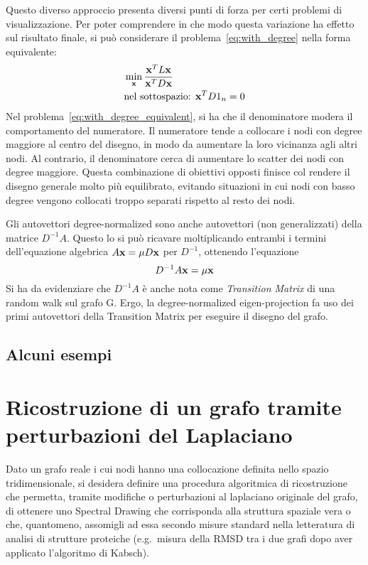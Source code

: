 \documentclass[10pt,a4paper]{article}
\begin{document}
Questo diverso approccio presenta diversi punti di forza per certi problemi di visualizzazione.
Per poter comprendere in che modo questa variazione ha effetto sul risultato finale, si può considerare il problema~\eqref{eq:with_degree} nella forma equivalente:
\begin{align}
    & \min_{\vb{x}} \frac{\vb{x}^T L \vb{x}}{\vb{x}^T D \vb{x}} \label{eq:with_degree_equivalent}\\
    & \text{nel sottospazio: } \vb{x}^T D 1_n = 0
\end{align}
Nel problema~\eqref{eq:with_degree_equivalent}, si ha che il denominatore modera il comportamento del numeratore.
Il numeratore tende a collocare i nodi con degree maggiore al centro del disegno, in modo da aumentare la loro vicinanza agli altri nodi.
Al contrario, il denominatore cerca di aumentare lo scatter dei nodi con degree maggiore.
Questa combinazione di obiettivi opposti finisce col rendere il disegno generale molto più equilibrato, evitando situazioni in cui nodi con basso degree vengono collocati troppo separati rispetto al resto dei nodi.

Gli autovettori degree-normalized sono anche autovettori (non generalizzati) della matrice \(D^{-1} A\).
Questo lo si può ricavare moltiplicando entrambi i termini dell'equazione algebrica \(A\vb{x} = \mu D \vb{x}\) per \(D^{-1}\), ottenendo l'equazione
\begin{equation}
    D^{-1} A \vb{x} = \mu\vb{x}
\end{equation}
Si ha da evidenziare che \(D^{-1} A\) è anche nota come \textit{Transition Matrix} di una random walk sul grafo G. Ergo, la degree-normalized eigen-projection fa uso dei primi autovettori della Transition Matrix per eseguire il disegno del grafo.


\subsection{Alcuni esempi}\label{subsec:drawing_examples}

\section{Ricostruzione di un grafo tramite perturbazioni del Laplaciano}\label{sec:perturbazioni}

Dato un grafo reale i cui nodi hanno una collocazione definita nello spazio tridimensionale, si desidera definire una procedura algoritmica di ricostruzione che permetta, tramite modifiche o perturbazioni al laplaciano originale del grafo, di ottenere uno Spectral Drawing che corrisponda alla struttura spaziale vera o che, quantomeno, assomigli ad essa secondo misure standard nella letteratura di analisi di strutture proteiche (e.g.~misura della RMSD tra i due grafi dopo aver applicato l'algoritmo di Kabsch).
\end{document}
